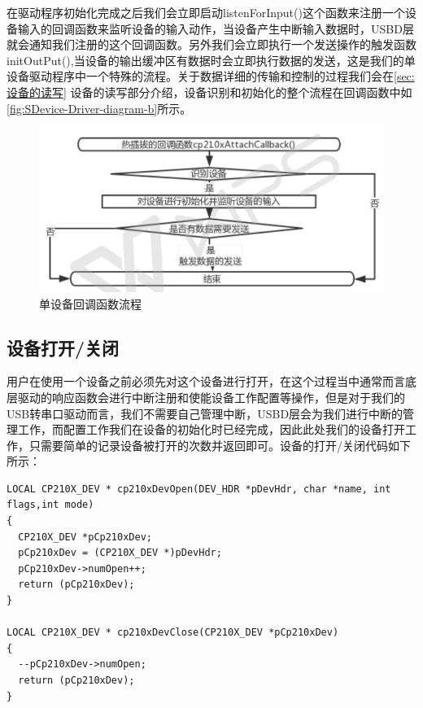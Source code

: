 	在驱动程序初始化完成之后我们会立即启动listenForInput()这个函数来注册一个设备输入的回调函数来监听设备的输入动作，当设备产生中断输入数据时，USBD层就会通知我们注册的这个回调函数。另外我们会立即执行一个发送操作的触发函数initOutPut(),当设备的输出缓冲区有数据时会立即执行数据的发送，这是我们的单设备驱动程序中一个特殊的流程。关于数据详细的传输和控制的过程我们会在\autoref{sec:设备的读写} 设备的读写部分介绍，设备识别和初始化的整个流程在回调函数中如\autoref{fig:SDevice-Driver-diagram-b}所示。
\begin{figure}[!h]
\centering
\includegraphics[width=1.0\textwidth]{./graphics/SDev-Drv-Diagram-b.pdf}
\caption{单设备回调函数流程}\label{fig:SDevice-Driver-diagram-b}
\end{figure}


\subsection{设备打开/关闭}	
	
	用户在使用一个设备之前必须先对这个设备进行打开，在这个过程当中通常而言底层驱动的响应函数会进行中断注册和使能设备工作配置等操作，但是对于我们的USB转串口驱动而言，我们不需要自己管理中断，USBD层会为我们进行中断的管理工作，而配置工作我们在设备的初始化时已经完成，因此此处我们的设备打开工作，只需要简单的记录设备被打开的次数并返回即可。设备的打开/关闭代码如下所示：
	
\lstset{language=C}
\begin{lstlisting}
LOCAL CP210X_DEV * cp210xDevOpen(DEV_HDR *pDevHdr, char *name, int flags,int mode)
{
  CP210X_DEV *pCp210xDev;
  pCp210xDev = (CP210X_DEV *)pDevHdr;	
  pCp210xDev->numOpen++;
  return (pCp210xDev);
}

LOCAL CP210X_DEV * cp210xDevClose(CP210X_DEV *pCp210xDev)
{
  --pCp210xDev->numOpen;
  return (pCp210xDev);
}

\end{lstlisting}

